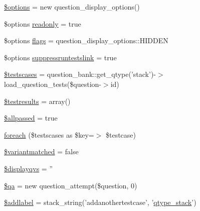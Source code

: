 \begin{DoxyCompactItemize}
\item 
\hyperlink{questiontestrun_8php_a011800c63ece4cbbfa77136a20607023}{\$options} = new question\_\-display\_\-options()
\item 
\$options \hyperlink{questiontestrun_8php_a78c524eb69c50edb232234e0bc6b4de9}{readonly} = true
\item 
\$options \hyperlink{questiontestrun_8php_adcb2a3f70c8c91986e6561111d0d9b0f}{flags} = question\_\-display\_\-options::HIDDEN
\item 
\$options \hyperlink{questiontestrun_8php_a27730100abd83366c35b68c4b9a7b5ec}{suppressruntestslink} = true
\item 
\hyperlink{questiontestrun_8php_a964bf7377831044ea8f3228e1323ddf2}{\$testscases} = question\_\-bank::get\_\-qtype('stack')-\/$>$load\_\-question\_\-tests(\$question-\/$>$id)
\item 
\hyperlink{questiontestrun_8php_a3e5313c6f829a7878736c734704294fd}{\$testresults} = array()
\item 
\hyperlink{questiontestrun_8php_ab5a10be91c162cb48ac439a779b80046}{\$allpassed} = true
\item 
\hyperlink{questiontestrun_8php_afd34bd4e31a3575bb885c2bd1822421e}{foreach} (\$testscases as \$key=$>$ \$testcase)
\item 
\hyperlink{questiontestrun_8php_a097507b0d1ee2970b0b9c450e453280d}{\$variantmatched} = false
\item 
\hyperlink{questiontestrun_8php_a186e58741cf4a169829b703a5abd2ab4}{\$displayqvs} = ''
\item 
\hyperlink{questiontestrun_8php_a6eb71c1db10cf807d2a126758ad4a3db}{\$qa} = new question\_\-attempt(\$question, 0)
\item 
\hyperlink{questiontestrun_8php_a4bd0883974ba272756b00624f6ebcf5d}{\$addlabel} = stack\_\-string('addanothertestcase', '\hyperlink{classqtype__stack}{qtype\_\-stack}')
\end{DoxyCompactItemize}


